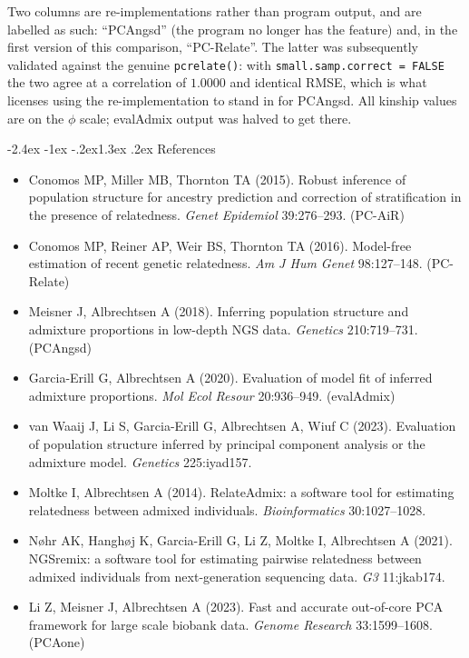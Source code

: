 \documentclass[10pt,a4paper]{article}
\makeatletter
\renewcommand\section{\@startsection{section}{1}{\z@}%
  {-2.4ex \@plus -1ex \@minus -.2ex}{1.3ex \@plus.2ex}%
  {\normalfont\large\bfseries\color{hdr}}}
\newenvironment{tightitem}{%
  \begin{itemize}\setlength{\itemsep}{1pt}\setlength{\parskip}{0pt}%
  \setlength{\topsep}{3pt}\setlength{\parsep}{0pt}}{\end{itemize}}
\makeatother
\begin{document}
Two columns are re-implementations rather than program output, and are labelled as such: ``PCAngsd'' (the
program no longer has the feature) and, in the first version of this comparison, ``PC-Relate''. The latter
was subsequently validated against the genuine \texttt{pcrelate()}: with \texttt{small.samp.correct = FALSE}
the two agree at a correlation of $1.0000$ and identical RMSE, which is what licenses using the
re-implementation to stand in for PCAngsd. All kinship values are on the $\phi$ scale; evalAdmix output was
halved to get there.

\section{References}
\small
\begin{tightitem}
  \item Conomos MP, Miller MB, Thornton TA (2015). Robust inference of population structure for ancestry prediction and correction of stratification in the presence of relatedness. \emph{Genet Epidemiol} 39:276--293. (PC-AiR)
  \item Conomos MP, Reiner AP, Weir BS, Thornton TA (2016). Model-free estimation of recent genetic relatedness. \emph{Am J Hum Genet} 98:127--148. (PC-Relate)
  \item Meisner J, Albrechtsen A (2018). Inferring population structure and admixture proportions in low-depth NGS data. \emph{Genetics} 210:719--731. (PCAngsd)
  \item Garcia-Erill G, Albrechtsen A (2020). Evaluation of model fit of inferred admixture proportions. \emph{Mol Ecol Resour} 20:936--949. (evalAdmix)
  \item van Waaij J, Li S, Garcia-Erill G, Albrechtsen A, Wiuf C (2023). Evaluation of population structure inferred by principal component analysis or the admixture model. \emph{Genetics} 225:iyad157.
  \item Moltke I, Albrechtsen A (2014). RelateAdmix: a software tool for estimating relatedness between admixed individuals. \emph{Bioinformatics} 30:1027--1028.
  \item N\o hr AK, Hangh\o j K, Garcia-Erill G, Li Z, Moltke I, Albrechtsen A (2021). NGSremix: a software tool for estimating pairwise relatedness between admixed individuals from next-generation sequencing data. \emph{G3} 11:jkab174.
  \item Li Z, Meisner J, Albrechtsen A (2023). Fast and accurate out-of-core PCA framework for large scale biobank data. \emph{Genome Research} 33:1599--1608. (PCAone)
\end{tightitem}
\end{document}
